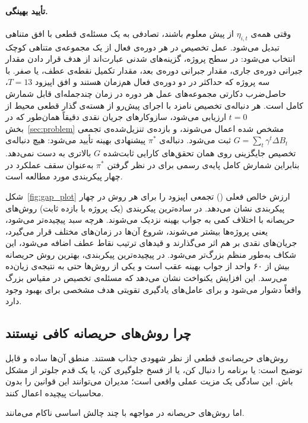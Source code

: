 \paragraph{تأیید بهینگی.}
وقتی همه‌ی $\eta_{i,t}$ از پیش معلوم باشند،  تصادفی به
یک مسئله‌ی قطعی با افق متناهی تبدیل می‌شود. عمل تخصیص در
هر دوره‌ی فعال از یک مجموعه‌ی متناهی کوچک انتخاب می‌شود: در سطح
پروژه، گزینه‌های شدنی عبارت‌اند از هدف قرار دادن مقدار جبرانی
دوره‌ی جاری، مقدار جبرانی دوره‌ی بعد، مقدار تکمیل نقطه‌ی عطف،
یا صفر. با سه پروژه که حداکثر در دو دوره‌ی فعال هم‌زمان هستند
و افق اپیزود $T = 13$، حاصل‌ضرب دکارتی مجموعه‌های عمل هر دوره
در زمان چندجمله‌ای قابل شمارش کامل است. هر دنباله‌ی تخصیص نامزد
با اجرای پیش‌رو از هسته‌ی گذار قطعی محیط از $t = 0$ ارزیابی
می‌شود، سازوکارهای جریان نقدی  دقیقاً همان‌طور که در
بخش~\ref{sec:problem} مشخص شده اعمال می‌شوند، و بازده‌ی تنزیل‌شده‌ی
تجمعی $G = \sum_{t} \gamma^t \Delta B_t$ ثبت می‌شود. دنباله‌ی
$\pi^*$ پیشنهادی بهینه تأیید می‌شود: هیچ دنباله‌ی تخصیص جایگزینی
روی همان تحقق‌های کارایی ثابت‌شده $G$ بالاتری به دست نمی‌دهد.
بنابراین شمارش کامل پایه‌ی رسمی برای در نظر گرفتن $\pi^*$ به‌عنوان
سقف عملکرد در چهار پیکربندی مورد مطالعه است.

شکل~\ref{fig:gap_plot} ارزش خالص فعلی () تجمعی اپیزود را
برای هر روش در چهار پیکربندی نشان می‌دهد.
در ساده‌ترین پیکربندی (یک پروژه با بازده ثابت) روش‌های حریصانه با
اختلاف کمی به جواب بهینه نزدیک می‌شوند.
هرچه سبد پیچیده‌تر می‌شود، یعنی پروژه‌ها بیشتر می‌شوند، شروع آن‌ها
در زمان‌های مختلف قرار می‌گیرد، جریان‌های نقدی بر هم اثر می‌گذارند
و قیدهای ترتیب نقاط عطف اضافه می‌شود، این شکاف به‌طور منظم بزرگ‌تر
می‌شود.
در پیچیده‌ترین پیکربندی، بهترین روش حریصانه بیش از ۶۰ واحد
 از جواب بهینه عقب است و یکی از روش‌ها حتی به نتیجه‌ی
زیان‌ده می‌رسد.
این افزایش یکنواخت نشان می‌دهد که مسئله‌ی تخصیص در مقیاس بزرگ
واقعاً دشوار می‌شود و برای عامل‌های یادگیری تقویتی هدف مشخصی برای
بهبود وجود دارد.

\subsection{چرا روش‌های حریصانه کافی نیستند}
\label{subsec:why_greedy_fails}

روش‌های حریصانه‌ی قطعی از نظر شهودی جذاب هستند. منطق آن‌ها ساده
و قابل توضیح است: یا برنامه را دنبال کن، یا از فسخ جلوگیری کن،
یا یک قدم جلوتر از مشکل باش. این سادگی یک مزیت عملی واقعی است؛
مدیران می‌توانند این قوانین را بدون محاسبات پیچیده اعمال کنند.

اما روش‌های حریصانه در مواجهه با چند چالش اساسی ناکام می‌مانند.

